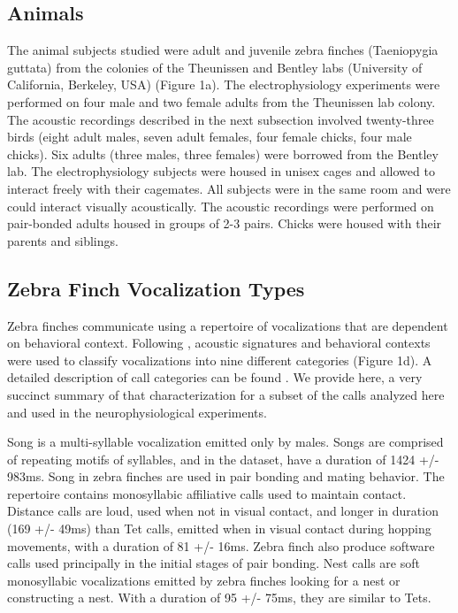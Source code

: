 \subsection{Animals}

The animal subjects studied were adult and juvenile zebra finches (Taeniopygia guttata) from the colonies of the Theunissen and Bentley labs (University of California, Berkeley, USA) (Figure 1a). The electrophysiology experiments were performed on four male and two female adults from the Theunissen lab colony. The acoustic recordings described in the next subsection involved twenty-three birds (eight adult males, seven adult females, four female chicks, four male chicks). Six adults (three males, three females) were borrowed from the Bentley lab.
The electrophysiology subjects were housed in unisex cages and allowed to interact freely with their cagemates. All subjects were in the same room and were could interact visually acoustically. The acoustic recordings were performed on pair-bonded adults housed in groups of 2-3 pairs. Chicks were housed with their parents and siblings.

\subsection{Zebra Finch Vocalization Types}

Zebra finches communicate using a repertoire of vocalizations that are dependent on behavioral context. Following \cite{Zann1996}, acoustic signatures and behavioral contexts were used to classify vocalizations into nine different categories (Figure 1d). A detailed description of call categories can be found \cite{Elie2015a}. We provide here, a very succinct summary of that characterization for a subset of the calls analyzed here and used in the neurophysiological experiments.

Song is a multi-syllable vocalization emitted only by males. Songs are comprised of repeating motifs of syllables, and in the dataset, have a duration of 1424 +/- 983ms. Song in zebra finches are used in pair bonding and mating behavior. The repertoire contains monosyllabic affiliative calls used to maintain contact. Distance calls are loud, used when not in visual contact, and longer in duration (169 +/- 49ms) than Tet calls, emitted when in visual contact during hopping movements, with a duration of 81 +/- 16ms. Zebra finch also produce software calls used principally in the initial stages of pair bonding. Nest calls are soft monosyllabic vocalizations emitted by zebra finches looking for a nest or constructing a nest. With a duration of 95 +/- 75ms, they are similar to Tets.

